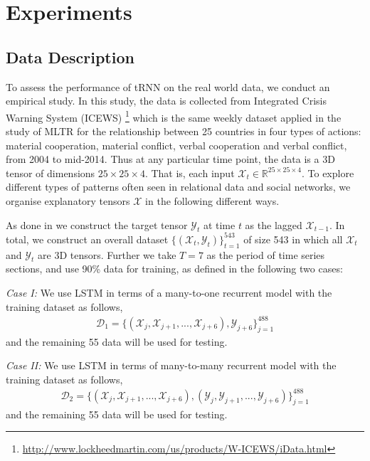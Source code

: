 \documentclass[journal]{IEEEtran}
\newcounter{gaocomm}
\newcommand{\GaoC}[1]{\textcolor{blue-violet}{\stepcounter{gaocomm}{\bf [Junbin's comment \arabic{gaocomm}: #1]}\;}}
\begin{document}
\section{Experiments} \label{Sec:4} 
\subsection{Data Description}
To assess the performance of tRNN on the real world data, we conduct an empirical study. In this study, the data is collected from Integrated Crisis Warning System (ICEWS) \footnote{\url{http://www.lockheedmartin.com/us/products/W-ICEWS/iData.html}} which is the same weekly dataset applied in the study of MLTR \cite{Hoff2015} for the relationship between 25 countries in four types of actions:  material cooperation, material conflict, verbal cooperation and verbal conflict, from 2004 to mid-2014. Thus at any particular time point, the data is a 3D tensor of dimensions $25\times 25\times 4$. That is, each input ${\mathcal{X}}_t \in \mathbb{R}^{25\times 25\times 4}$. To explore different types of patterns often seen in relational data and social networks, we organise explanatory tensors $\mathcal{X}$ in the following different ways.  

As done in \cite{Hoff2015} we construct the target tensor $\mathcal{Y}_t$ at time $t$ as the lagged $\mathcal{X}_{t-1}$. In total, we construct an overall dataset $\{(\mathcal{X}_t, \mathcal{Y}_t)\}^{543}_{t=1}$ of size 543 in which all $\mathcal{X}_t$ and $\mathcal{Y}_t$ are 3D tensors. Further we take $T=7$ as the period of time series sections, and use 90\% data for training, as defined in the following two cases:

\textit{Case I:} We use LSTM in terms of a many-to-one recurrent model  with the training dataset as follows, 
\begin{align*}
\mathcal{D}_1 = \{(\mathcal{X}_{j},\mathcal{X}_{j+1}, ..., \mathcal{X}_{j+6}), \mathcal{Y}_{j+6}\}^{488}_{j=1}
\end{align*}
and the remaining 55 data will be used for testing. 

\textit{Case II:} We use LSTM in terms of many-to-many recurrent model   with the training dataset as follows,
\begin{align*}
\mathcal{D}_2 = \{(\mathcal{X}_{j},\mathcal{X}_{j+1}, ..., \mathcal{X}_{j+6}), (\mathcal{Y}_{j}, \mathcal{Y}_{j+1}, ...,\mathcal{Y}_{j+6})\}^{488}_{j=1}
\end{align*}
and the remaining 55 data will be used for testing. %
\end{document}

